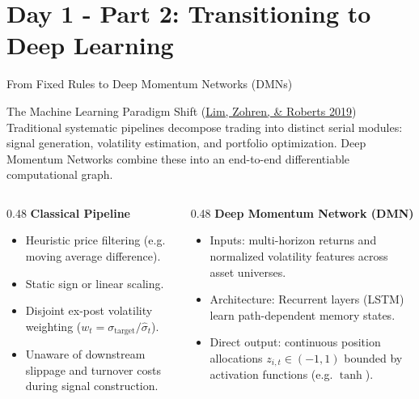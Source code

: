 \documentclass[10pt]{beamer}
\begin{document}
\section{Day 1 - Part 2: Transitioning to Deep Learning}

\begin{frame}{From Fixed Rules to Deep Momentum Networks (DMNs)}
  \begin{block}{The Machine Learning Paradigm Shift (\href{https://arxiv.org/abs/1904.04912}{Lim, Zohren, \& Roberts 2019})}
    Traditional systematic pipelines decompose trading into distinct serial modules: signal generation, volatility estimation, and portfolio optimization. Deep Momentum Networks combine these into an end-to-end differentiable computational graph.
  \end{block}
  \vspace{0.1cm}
  \begin{columns}[t]
    \begin{column}{0.48\textwidth}
      \textbf{Classical Pipeline}
      \begin{itemize}\scriptsize
        \item Heuristic price filtering (e.g. moving average difference).
        \item Static sign or linear scaling.
        \item Disjoint ex-post volatility weighting ($w_t = \sigma_{\text{target}} / \hat{\sigma}_t$).
        \item Unaware of downstream slippage and turnover costs during signal construction.
      \end{itemize}
    \end{column}
    \begin{column}{0.48\textwidth}
      \textbf{Deep Momentum Network (DMN)}
      \begin{itemize}\scriptsize
        \item Inputs: multi-horizon returns and normalized volatility features across asset universes.
        \item Architecture: Recurrent layers (LSTM) learn path-dependent memory states.
        \item Direct output: continuous position allocations $z_{i,t} \in (-1, 1)$ bounded by activation functions (e.g. $\tanh$).
      \end{itemize}
    \end{column}
  \end{columns}
\end{frame}
\end{document}
